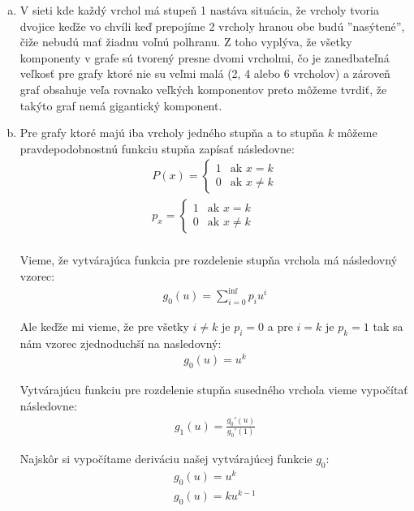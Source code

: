 \documentclass[a4paper]{article}
\begin{document}
\begin{enumerate}[(a)]
	\item 
	V sieti kde každý vrchol má stupeň 1 nastáva situácia, že vrcholy tvoria dvojice keďže vo chvíli keď prepojíme 2 vrcholy hranou obe budú ''nasýtené'', čiže nebudú mať žiadnu voľnú polhranu. Z toho vyplýva, že všetky komponenty v grafe sú tvorený presne dvomi vrcholmi, čo je zanedbateľná veľkosť pre grafy ktoré nie su veľmi malá (2, 4 alebo 6 vrcholov) a zároveň graf obsahuje veľa rovnako veľkých komponentov preto môžeme tvrdiť, že takýto graf nemá gigantický komponent.
	
	\item 
	Pre grafy ktoré majú iba vrcholy jedného stupňa a to stupňa $k$ môžeme pravdepodobnostnú funkciu stupňa zapísať následovne:
	\begin{gather*}
		P(x) = \begin{cases} 1 & \text{ak } x = k \\
			0 & \text{ak } x \neq k      %
		\end{cases} \\
		p_x = \begin{cases} 1 & \text{ak } x = k \\
			0 & \text{ak } x \neq k      %
		\end{cases} \\
	\end{gather*} 
	
	Vieme, že vytvárajúca funkcia pre rozdelenie stupňa vrchola má následovný vzorec:
	\begin{gather*}
		g_0(u) = \sum_{i=0}^{\inf} p_iu^i
	\end{gather*} 

	Ale keďže mi vieme, že pre všetky $i\neq k$ je $p_i=0$ a pre $i=k$ je $p_k=1$ tak sa nám vzorec zjednoduchší na nasledovný:
	\begin{gather*}
		g_0(u) = u^k
	\end{gather*} 

	Vytvárajúcu funkciu pre rozdelenie stupňa susedného vrchola vieme vypočítať následovne:
	\begin{gather*}
		g_1(u) = \frac{g_0'(u)}{g_0'(1)}
	\end{gather*} 

	Najskôr si vypočítame deriváciu našej vytvárajúcej funkcie $g_0$:
	\begin{gather*}
		g_0(u) = u^k \\
		g_0(u) = ku^{k-1}
	\end{gather*}
	

\end{enumerate}
\end{document}
